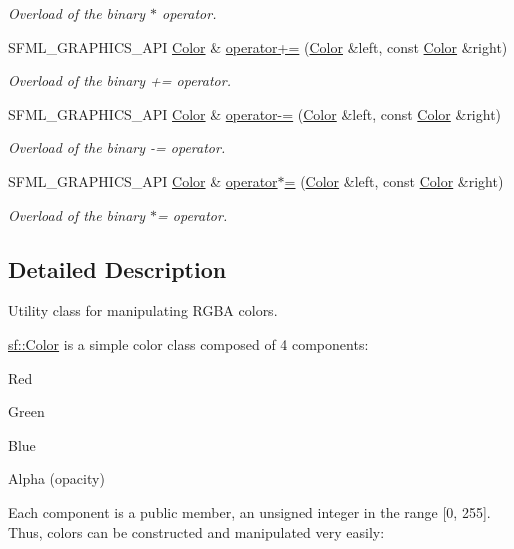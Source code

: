 \begin{DoxyCompactItemize}
\begin{DoxyCompactList}\small\item\em Overload of the binary $\ast$ operator. \end{DoxyCompactList}\item 
S\+F\+M\+L\+\_\+\+G\+R\+A\+P\+H\+I\+C\+S\+\_\+\+A\+PI \mbox{\hyperlink{classsf_1_1_color}{Color}} \& \mbox{\hyperlink{classsf_1_1_color_a19917f2453a4acfd69de2539bfab8031}{operator+=}} (\mbox{\hyperlink{classsf_1_1_color}{Color}} \&left, const \mbox{\hyperlink{classsf_1_1_color}{Color}} \&right)
\begin{DoxyCompactList}\small\item\em Overload of the binary += operator. \end{DoxyCompactList}\item 
S\+F\+M\+L\+\_\+\+G\+R\+A\+P\+H\+I\+C\+S\+\_\+\+A\+PI \mbox{\hyperlink{classsf_1_1_color}{Color}} \& \mbox{\hyperlink{classsf_1_1_color_a86ceee6b959136932020db4036918ecd}{operator-\/=}} (\mbox{\hyperlink{classsf_1_1_color}{Color}} \&left, const \mbox{\hyperlink{classsf_1_1_color}{Color}} \&right)
\begin{DoxyCompactList}\small\item\em Overload of the binary -\/= operator. \end{DoxyCompactList}\item 
S\+F\+M\+L\+\_\+\+G\+R\+A\+P\+H\+I\+C\+S\+\_\+\+A\+PI \mbox{\hyperlink{classsf_1_1_color}{Color}} \& \mbox{\hyperlink{classsf_1_1_color_a8953be58a47ced92fb25966d6ee90511}{operator$\ast$=}} (\mbox{\hyperlink{classsf_1_1_color}{Color}} \&left, const \mbox{\hyperlink{classsf_1_1_color}{Color}} \&right)
\begin{DoxyCompactList}\small\item\em Overload of the binary $\ast$= operator. \end{DoxyCompactList}\end{DoxyCompactItemize}


\subsection{Detailed Description}
Utility class for manipulating R\+G\+BA colors. 

\begin{DoxyVerb}\end{DoxyVerb}


\mbox{\hyperlink{classsf_1_1_color}{sf\+::\+Color}} is a simple color class composed of 4 components\+: \begin{DoxyItemize}
\item Red \item Green \item Blue \item Alpha (opacity)\end{DoxyItemize}
Each component is a public member, an unsigned integer in the range \mbox{[}0, 255\mbox{]}. Thus, colors can be constructed and manipulated very easily\+:


